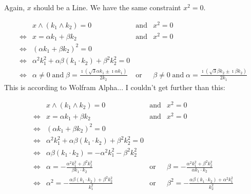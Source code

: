 \documentclass[a4paper,11pt,twoside,openright]{article}
\newcommand{\textgt}[1]{\textsf{#1}}
\newcommand{\pLine}{\textgt{Line}\xspace}
\newcommand{\en}{\ensuremath{\mathbin{\mbox{and}}}}
\newcommand{\of}{\ensuremath{\mathbin{\mbox{or}}}}
\newcommand{\eql}{\ensuremath{\Leftrightarrow}}
\begin{document}
Again, $x$ should be a \pLine.  We have the same constraint $x^2 = 0$.

\[
\begin{array}{rlcl}
 & x \wedge (k_1 \wedge k_2) = 0 &\en& x^2 = 0 \\
\eql& x = \alpha k_1 + \beta k_2 &\en& x^2 = 0 \\
\eql& \left(\alpha k_1 + \beta k_2\right)^2 = 0 \\
\eql& \alpha^2 k_1^2 + \alpha \beta (k_1 \cdot k_2) + \beta^2 k_2^2 = 0 \\
\eql& \alpha \not= 0 \en \beta = \frac{\imath \left( \sqrt{3} \alpha k_1 \pm \imath \alpha k_1\right)}{2k_2} &\of& \beta \not= 0 \en \alpha = \frac{\imath \left( \sqrt{3} \beta k_2 \pm \imath \beta k_2\right)}{2k_1}
\end{array}
\]
This is according to Wolfram Alpha... I couldn't get further than this:

\[
\begin{array}{rlcl}
 & x \wedge (k_1 \wedge k_2) = 0 &\en& x^2 = 0 \\
\eql& x = \alpha k_1 + \beta k_2 &\en& x^2 = 0 \\
\eql& \left(\alpha k_1 + \beta k_2\right)^2 = 0 \\
\eql& \alpha^2 k_1^2 + \alpha \beta (k_1 \cdot k_2) + \beta^2 k_2^2 = 0 \\
\eql& \alpha \beta (k_1 \cdot k_2) = -\alpha^2 k_1^2 - \beta^2 k_2^2 \\
\eql& \alpha = - \frac{\alpha^2 k_1^2 + \beta^2 k_2^2}{\beta k_1 \cdot k_2} &\of& \beta = - \frac{\alpha^2 k_1^2 + \beta^2 k_2^2}{\alpha k_1 \cdot k_2} \\
\eql& \alpha^2 = -\frac{\alpha \beta (k_1 \cdot k_2) + \beta^2 k_2^2}{k_1^2} &\of& \beta^2 = -\frac{\alpha \beta (k_1 \cdot k_2) + \alpha^2 k_1^2}{k_2^2}
\end{array}
\]
\end{document}
